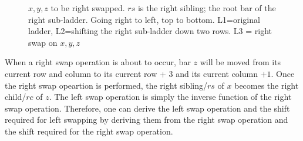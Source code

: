 \begin{figure}[!htp]
\begin{minipage}{.4\textwidth}
	\end{minipage}
		\begin{minipage}{.4\textwidth}
	\end{minipage}
	\caption{$x,y,z$ to be right swapped. $rs$ is the right sibling; the root bar of the right sub-ladder.
	Going right to left, top to bottom. L1=original ladder, L2=shifting the right sub-ladder down two rows. L3 = right swap on $x,y,z$}
	\label{Fig:SwapAndShift}
\end{figure}

When a right swap operation is about to occur, bar $z$ will be moved from its current row and column to its current row + $3$ 
and its current column $+1$. Once the right swap opeartion is performed, 
the right sibling/$rs$ of $x$ becomes the right child/$rc$ of $z$.
The left swap operation is simply the inverse function of the right swap operation. 
Therefore, one can derive the left swap operation and the shift required for left swapping by deriving them 
from the right swap operation and the shift required for the right swap operation.

